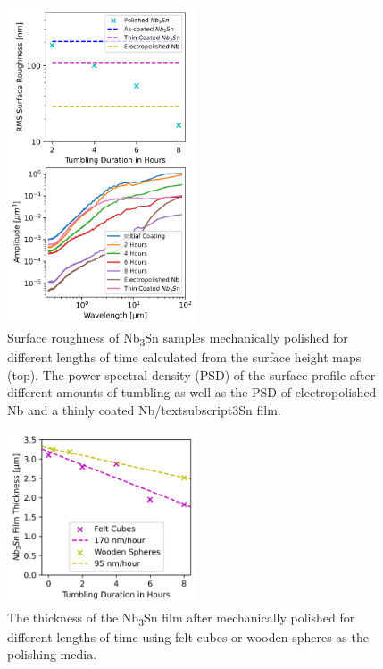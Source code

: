 \documentclass[reprint,amsmath,amssymb,aps]{revtex4-2}%
\begin{document}
%


\begin{figure}[t]%
\centering%
\includegraphics[width=0.5\textwidth]{../doc/figs/Surface_Roughness_Graph.png}%
\caption{Surface roughness of Nb\textsubscript{3}Sn samples mechanically polished for different lengths of time calculated from the surface height maps (top). The power spectral density (PSD) of the surface profile after different amounts of tumbling as well as the PSD of electropolished Nb and a thinly coated Nb/textsubscript{3}Sn film.}%
\label{fig:surfaceroughnessgraph}%
\end{figure}

%


\begin{figure}[t]%
\centering%
\includegraphics[width=0.5\textwidth]{../doc/figs/Material_Removal_Graph.png}%
\caption{The thickness of the Nb\textsubscript{3}Sn film after mechanically polished for different lengths of time using felt cubes or wooden spheres as the polishing media.}%
\label{fig:materialremovalgraph}%
\end{figure}
\end{document}
